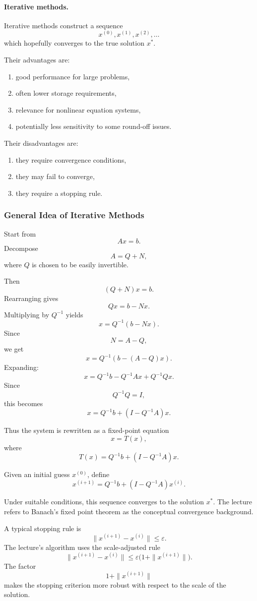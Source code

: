 \documentclass[10pt, letterpaper]{article}
\begin{document}
\paragraph{Iterative methods.}
Iterative methods construct a sequence
\[
x^{(0)},x^{(1)},x^{(2)},\dots
\]
which hopefully converges to the true solution \(x^\ast\).

Their advantages are:
\begin{enumerate}
    \item good performance for large problems,
    \item often lower storage requirements,
    \item relevance for nonlinear equation systems,
    \item potentially less sensitivity to some round-off issues.
\end{enumerate}
Their disadvantages are:
\begin{enumerate}
    \item they require convergence conditions,
    \item they may fail to converge,
    \item they require a stopping rule.
\end{enumerate}

\subsubsection{General Idea of Iterative Methods}

Start from
\[
Ax=b.
\]
Decompose
\[
A=Q+N,
\]
where \(Q\) is chosen to be easily invertible.

Then
\[
(Q+N)x=b.
\]
Rearranging gives
\[
Qx=b-Nx.
\]
Multiplying by \(Q^{-1}\) yields
\[
x=Q^{-1}(b-Nx).
\]
Since
\[
N=A-Q,
\]
we get
\[
x=Q^{-1}(b-(A-Q)x).
\]
Expanding:
\[
x=Q^{-1}b-Q^{-1}Ax+Q^{-1}Qx.
\]
Since
\[
Q^{-1}Q=I,
\]
this becomes
\[
x=Q^{-1}b+(I-Q^{-1}A)x.
\]

Thus the system is rewritten as a fixed-point equation
\[
x=T(x),
\]
where
\[
T(x)=Q^{-1}b+(I-Q^{-1}A)x.
\]

Given an initial guess \(x^{(0)}\), define
\[
x^{(i+1)}
=
Q^{-1}b+(I-Q^{-1}A)x^{(i)}.
\]

Under suitable conditions, this sequence converges to the solution \(x^\ast\). The lecture refers to Banach's fixed point theorem as the conceptual convergence background.

A typical stopping rule is
\[
\|x^{(i+1)}-x^{(i)}\|\leq \varepsilon.
\]
The lecture's algorithm uses the scale-adjusted rule
\[
\|x^{(i+1)}-x^{(i)}\|
\leq
\varepsilon\bigl(1+\|x^{(i+1)}\|\bigr).
\]
The factor
\[
1+\|x^{(i+1)}\|
\]
makes the stopping criterion more robust with respect to the scale of the solution.
\end{document}
